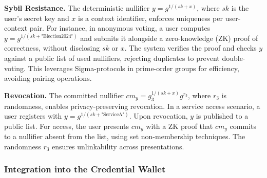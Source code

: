 \textbf{Sybil Resistance.} The deterministic nullifier $y = g^{1/(sk + x)}$, where $sk$ is the user's secret key and $x$ is a context identifier, enforces uniqueness per user-context pair. For instance, in anonymous voting, a user computes $y = g^{1/(sk + \text{"Election2024"})}$ and submits it alongside a zero-knowledge (ZK) proof of correctness, without disclosing $sk$ or $x$. The system verifies the proof and checks $y$ against a public list of used nullifiers, rejecting duplicates to prevent double-voting. This leverages Sigma-protocols in prime-order groups for efficiency, avoiding pairing operations.

\textbf{Revocation.} The committed nullifier $cm_y = g_3^{1/(sk + x)} g^{r_3}$, where $r_3$ is randomness, enables privacy-preserving revocation. In a service access scenario, a user registers with $y = g^{1/(sk + \text{"ServiceA"})}$. Upon revocation, $y$ is published to a public list. For access, the user presents $cm_y$ with a ZK proof that $cm_y$ commits to a nullifier absent from the list, using set non-membership techniques. The randomness $r_3$ ensures unlinkability across presentations.

\subsubsection{Integration into the Credential Wallet}

